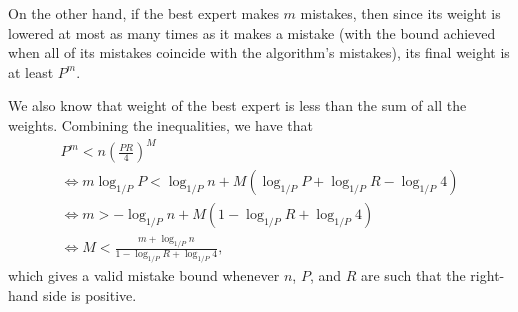 \documentclass[a4paper,12pt]{article}
\theoremstyle{remark}
\begin{document}
On the other hand, if the best expert makes $m$ mistakes, then since its weight is lowered at most as many times as it makes a mistake (with the bound achieved when all of its mistakes coincide with the algorithm's mistakes), its final weight is at least $P^m$. \par
We also know that weight of the best expert is less than the sum of all the weights. Combining the inequalities, we have that
\begin{gather*}
    P^m < n \left( \frac{PR}{4} \right)^M \\
    \Leftrightarrow m\log_{1/P}P < \log_{1/P} n + M(\log_{1/P}P + \log_{1/P}R - \log_{1/P}4) \\
    \Leftrightarrow m > -\log_{1/P} n + M(1 - \log_{1/P}R + \log_{1/P}4) \\
    \Leftrightarrow M < \frac{m + \log_{1/P} n}{1 - \log_{1/P}R + \log_{1/P}4},
\end{gather*}
which gives a valid mistake bound whenever $n$, $P$, and $R$ are such that the right-hand side is positive.
\end{document}
